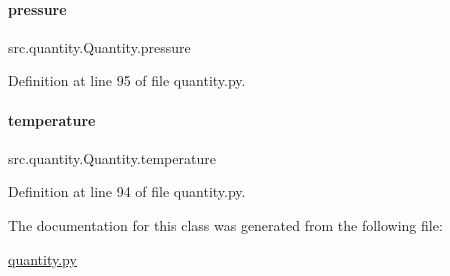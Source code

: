 \paragraph{\texorpdfstring{pressure}{pressure}}
{\footnotesize\ttfamily src.\+quantity.\+Quantity.\+pressure}



Definition at line 95 of file quantity.\+py.

\mbox{\label{classsrc_1_1quantity_1_1Quantity_a1f54d5969bb33f67e72bc9ff8c7d6b68}} 
\paragraph{\texorpdfstring{temperature}{temperature}}
{\footnotesize\ttfamily src.\+quantity.\+Quantity.\+temperature}



Definition at line 94 of file quantity.\+py.



The documentation for this class was generated from the following file\+:\begin{DoxyCompactItemize}
\item 
\hyperlink{quantity_8py}{quantity.\+py}\end{DoxyCompactItemize}
